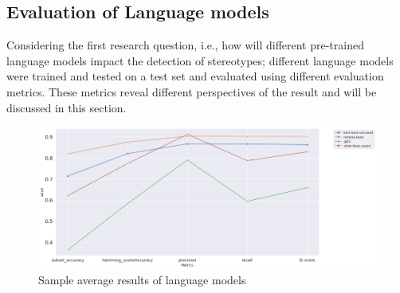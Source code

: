 
\subsection{Evaluation of Language models}
Considering the first research question, i.e., how will different pre-trained language models impact the detection of stereotypes; different language models were trained and tested on a test set and evaluated using different evaluation metrics. These metrics reveal different perspectives of the result and will be discussed in this section. 

\begin{figure}[h!]
    \centering
    \includegraphics[width=1\textwidth]{thesis/figures/summary.png}
    \caption{Sample average results of language models }
    \label{fig:model_wise_group_LM}
\end{figure}
